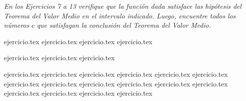 \vspace{1em}
\noindent \textit{En los Ejercicios 7 a 13 verifique que la función dada satisface las hipótesis del Teorema del Valor Medio en el intervalo indicado. Luego, encuentre todos los números $c$ que satisfagan la conclusión del Teorema del Valor Medio.}

\begin{enumerate}
    \setcounter{enumi}{6}
    \begin{minipage}{0.45\textwidth}
    {ejercicio.tex}
    {ejercicio.tex}
    {ejercicio.tex}
    {ejercicio.tex}
    \end{minipage}%
    \begin{minipage}{0.45\textwidth}
    {ejercicio.tex}
    {ejercicio.tex}
    {ejercicio.tex}
    \end{minipage}
\end{enumerate}

\vspace{1em}
\begin{enumerate}
    \setcounter{enumi}{13}
    {ejercicio.tex}
    {ejercicio.tex}
    {ejercicio.tex}
    {ejercicio.tex}
    {ejercicio.tex}
    {ejercicio.tex}
    {ejercicio.tex}
    {ejercicio.tex}
    {ejercicio.tex}
    {ejercicio.tex}
    {ejercicio.tex}
    {ejercicio.tex}
    {ejercicio.tex}
    {ejercicio.tex}
    {ejercicio.tex}
    {ejercicio.tex}
\end{enumerate}
